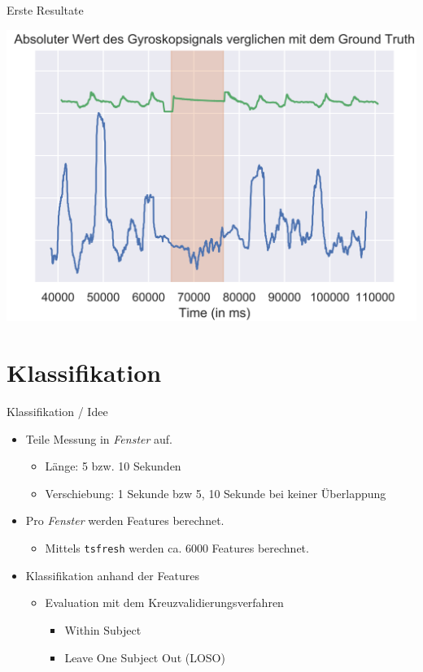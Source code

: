 \documentclass[18pt]{beamer}
\begin{document}
\begin{frame}{Erste Resultate}
    \begin{center}
        \includegraphics[scale=0.16]{images/data_analyzation/compare_raw_signal_with_flowDr_2.png}
    \end{center}
\end{frame}

\section{Klassifikation}
\begin{frame}{Klassifikation / Idee}
\begin{itemize}
    \item Teile Messung in \textit{Fenster} auf.
    \begin{itemize}
        \item Länge: 5 bzw. 10 Sekunden
        \item Verschiebung: 1 Sekunde bzw 5, 10 Sekunde bei keiner Überlappung
    \end{itemize}
    \item Pro \textit{Fenster} werden Features berechnet.
    \begin{itemize}
        \item Mittels \texttt{tsfresh} werden ca. 6000 Features berechnet.
    \end{itemize}
    \item Klassifikation anhand der Features
    \begin{itemize}
        \item Evaluation mit dem Kreuzvalidierungsverfahren
        \begin{itemize}
            \item Within Subject
            \item Leave One Subject Out (LOSO)
        \end{itemize}
    \end{itemize}
\end{itemize}
\end{frame}
\end{document}
